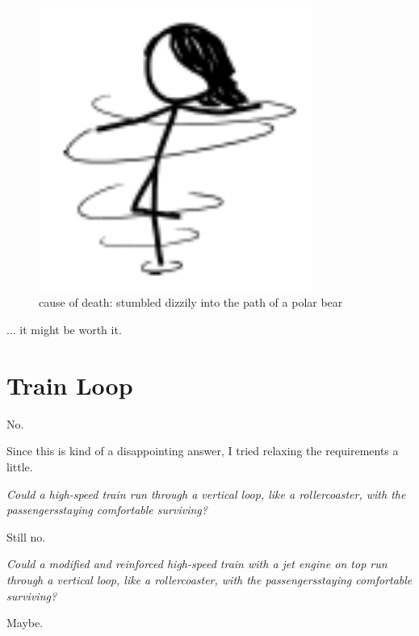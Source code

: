 \begin{figure}[!htbp]
\centering
\includegraphics[scale=0.5, max width=0.8\textwidth]{imgs/a/42/sunset_spinning.png}
\caption{cause of death: stumbled dizzily into the path of a polar bear}
\end{figure}

{... it might be worth it.}

{
\chapter{Train Loop}
}

\hfill{}

{No.}

{Since this is kind of a disappointing answer, I tried relaxing the requirements a little.}

{ \emph{Could a high-speed train run through a vertical loop, like a rollercoaster, with the passengers{staying comfortable} surviving?} }

{Still no.}

{ \emph{Could a modified and reinforced high-speed train with a jet engine on top run through a vertical loop, like a rollercoaster, with the passengers{staying comfortable} surviving?} }

{Maybe.}

